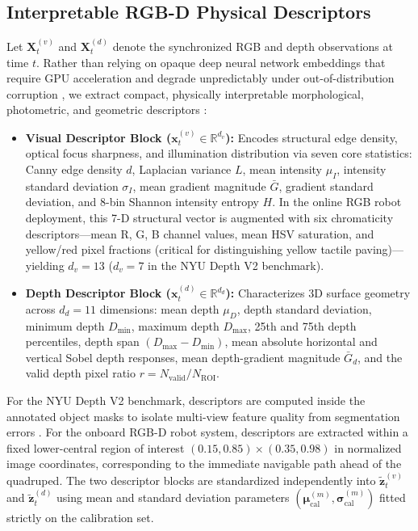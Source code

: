 \documentclass[11pt, a4paper]{article}
\begin{document}
\subsection{Interpretable RGB-D Physical Descriptors}
\label{subsec:descriptors}
Let $\mathbf{X}^{(v)}_t$ and $\mathbf{X}^{(d)}_t$ denote the synchronized RGB and depth observations at time $t$. Rather than relying on opaque deep neural network embeddings that require GPU acceleration and degrade unpredictably under out-of-distribution corruption \cite{sun2024bmfnet, wang2026guided}, we extract compact, physically interpretable morphological, photometric, and geometric descriptors \cite{richtsfeld2014learning, pan2016feature}:
\begin{itemize}
    \item \textbf{Visual Descriptor Block ($\mathbf{x}^{(v)}_t \in \mathbb{R}^{d_v}$):} Encodes structural edge density, optical focus sharpness, and illumination distribution via seven core statistics: Canny edge density $d$, Laplacian variance $L$, mean intensity $\mu_I$, intensity standard deviation $\sigma_I$, mean gradient magnitude $\bar{G}$, gradient standard deviation, and 8-bin Shannon intensity entropy $H$. In the online RGB robot deployment, this 7-D structural vector is augmented with six chromaticity descriptors—mean R, G, B channel values, mean HSV saturation, and yellow/red pixel fractions (critical for distinguishing yellow tactile paving)—yielding $d_v = 13$ ($d_v = 7$ in the NYU Depth V2 benchmark).
    \item \textbf{Depth Descriptor Block ($\mathbf{x}^{(d)}_t \in \mathbb{R}^{d_d}$):} Characterizes 3D surface geometry across $d_d = 11$ dimensions: mean depth $\mu_D$, depth standard deviation, minimum depth $D_{\min}$, maximum depth $D_{\max}$, 25th and 75th depth percentiles, depth span $(D_{\max}-D_{\min})$, mean absolute horizontal and vertical Sobel depth responses, mean depth-gradient magnitude $\bar{G}_d$, and the valid depth pixel ratio $r = N_{\mathrm{valid}}/N_{\mathrm{ROI}}$.
\end{itemize}

For the NYU Depth V2 benchmark, descriptors are computed inside the annotated object masks to isolate multi-view feature quality from segmentation errors \cite{tang2025cascading}. For the onboard RGB-D robot system, descriptors are extracted within a fixed lower-central region of interest $(0.15,0.85)\times(0.35,0.98)$ in normalized image coordinates, corresponding to the immediate navigable path ahead of the quadruped. The two descriptor blocks are standardized independently into $\tilde{\mathbf{z}}^{(v)}_t$ and $\tilde{\mathbf{z}}^{(d)}_t$ using mean and standard deviation parameters $(\bm{\mu}_{\text{cal}}^{(m)}, \bm{\sigma}_{\text{cal}}^{(m)})$ fitted strictly on the calibration set.
\end{document}
